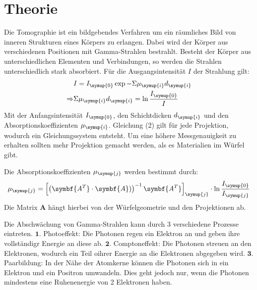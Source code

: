 \section{Theorie}
\label{sec:Theorie}

\cite{sample}
Die Tomographie ist ein bildgebendes Verfahren um ein räumliches Bild von inneren Strukturen
eines Körpers zu erlangen. Dabei wird der Körper aus verschiedenen Positionen mit
Gamma-Strahlen bestrahlt. Besteht der Körper aus unterschiedlichen Elementen und Verbindungen,
so werden die Strahlen unterschiedlich stark absorbiert. Für die Ausgangsintensität $I$
der Strahlung gilt:
\begin{align}
  &I=I_{\symup{0}} \exp{-\Sigma \mu_{\symup{i}} d_{\symup{i}}} \\
  \Rightarrow &\Sigma \mu_{\symup{i}} d_{\symup{i}} = \ln{\frac{I_{\symup{0}}}{I}}
\end{align}
Mit der Anfangsintensität $I_{\symup{0}}$, den Schichtdicken $d_{\symup{i}}$
und den Absorptionskoeffizienten $\mu_{\symup{i}}$.
Gleichung (2) gilt für jede Projektion, wodurch ein Gleichungssystem entsteht. Um eine höhere
Messgenauigkeit zu erhalten sollten mehr Projektion gemacht werden, als es
Materialien im Würfel gibt.

Die Absorptionskoeffizienten $\mu_{\symup{j}}$ werden bestimmt durch:
\begin{align}
  \mu_{\symup{j}} = \left[\left(\symbf{A^T} \cdot \symbf{A})\right)^{-1} \symbf{A^T}\right]_{\symup{j}} \cdot \ln{\frac{I_{\symup{0}}}{I_{\symup{j}}}}
\end{align}
Die Matrix $\symbf{A}$ hängt hierbei von der Würfelgeometrie und den Projektionen ab.

Die Abschwächung von Gamma-Strahlen kann durch 3 verschiedene Prozesse eintreten.
$\symbf{1.}$ Photoeffekt: Die Photonen regen ein Elektron an und geben ihre vollständigr Energie an diese ab.
$\symbf{2.}$ Comptoneffekt: Die Photonen streuen an den Elektronen, wodurch ein Teil oihrer Energie
an die Elektronen abgegeben wird.
$\symbf{3.}$ Paarbildung: In der Nähe der Atomkerne können die Photonen sich in ein Elektron und ein Positron
umwandeln. Dies geht jedoch nur, wenn die Photonen mindestens eine Ruhenenergie von 2 Elektronen
haben.

